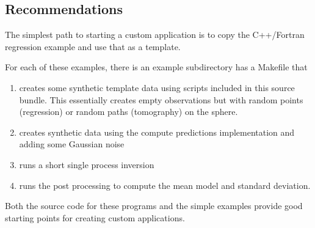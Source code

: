\documentclass[a4paper,12pt]{article}
\begin{document}
\subsection{Recommendations}

The simplest path to starting a custom application is to copy 
the C++/Fortran regression example and use that as
a template.

For each of these examples, there is an example subdirectory
has a Makefile that

\begin{enumerate}
\item creates some synthetic template data using scripts included in this source
  bundle. This essentially creates empty observations but with random points (regression) or
  random paths (tomography) on the sphere.
\item creates synthetic data using the compute predictions implementation and adding
  some Gaussian noise
\item runs a short single process inversion
\item runs the post processing to compute the mean model and standard deviation.
\end{enumerate}

Both the source code for these programs and the simple examples provide good
starting points for creating custom applications.




\end{document}
